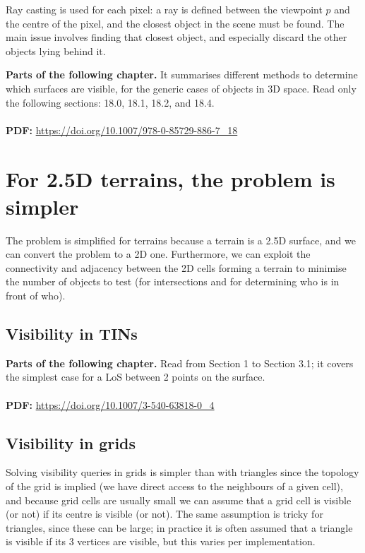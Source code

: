 Ray casting is used for each pixel: a ray is defined between the viewpoint $p$ and the centre of the pixel, and the closest object in the scene must be found.
The main issue involves finding that closest object, and especially discard the other objects lying behind it.


\begin{link-box}
\textbf{Parts of the following chapter.} It summarises different methods to determine which surfaces are visible, for the generic cases of objects in 3D space.
Read only the following sections: 18.0, 18.1, 18.2, and 18.4.
\\
\\
\textbf{PDF:} \url{https://doi.org/10.1007/978-0-85729-886-7_18}

\end{link-box}


%
\section{For 2.5D terrains, the problem is simpler}

The problem is simplified for terrains because a terrain is a 2.5D surface, and we can convert the problem to a 2D one.
Furthermore, we can exploit the connectivity and adjacency between the 2D cells forming a terrain to minimise the number of objects to test (for intersections and for determining who is in front of who).


%
\subsection{Visibility in TINs}

\begin{link-box}
\textbf{Parts of the following chapter.} 
Read from Section 1 to Section 3.1; it covers the simplest case for a LoS between 2 points on the surface.
\\
\\
\textbf{PDF:} \url{https://doi.org/10.1007/3-540-63818-0_4}
\end{link-box}


%
\subsection{Visibility in grids}

Solving visibility queries in grids is simpler than with triangles since the topology of the grid is implied (we have direct access to the neighbours of a given cell), and because grid cells are usually small we can assume that a grid cell is visible (or not) if its centre is visible (or not).
The same assumption is tricky for triangles, since these can be large; in practice it is often assumed that a triangle is visible if its 3 vertices are visible, but this varies per implementation.

